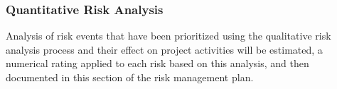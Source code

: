 \subsubsection*{Quantitative Risk Analysis}
Analysis of risk events that have been prioritized using the qualitative risk analysis process and their effect on project activities will be estimated, a numerical rating applied to each risk based on this analysis, and then documented in this section of the risk management plan.

